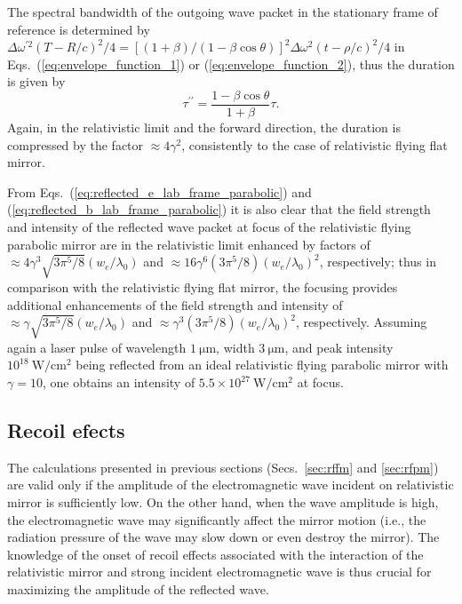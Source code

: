 \documentclass[10pt, a4paper, twoside, openright]{report}
\begin{document}
The spectral bandwidth of the outgoing wave packet in the stationary frame of reference is determined by $ \Delta \omega^{\prime 2} \left( T - R / c \right)^2 / 4 = \left[ \left( 1 + \beta \right) / \left( 1 - \beta \cos \theta \right) \right]^2 \Delta \omega^2 \left( t - \rho / c \right)^2 / 4 $ in Eqs.~(\ref{eq:envelope_function_1}) or (\ref{eq:envelope_function_2}), thus the duration is given by
\begin{equation}\label{key}
	\tau^{\prime \prime} = \frac{1 - \beta \cos \theta}{1 + \beta} \tau.
\end{equation}
Again, in the relativistic limit and the forward direction, the duration is compressed by the factor $ \approx 4 \gamma^2 $, consistently to the case of relativistic flying flat mirror.

From Eqs.~(\ref{eq:reflected_e_lab_frame_parabolic}) and (\ref{eq:reflected_b_lab_frame_parabolic}) it is also clear that the field strength and intensity of the reflected wave packet at focus of the relativistic flying parabolic mirror are in the relativistic limit enhanced by factors of $ \approx 4 \gamma^3 \sqrt{3 \pi^5 / 8} \left( w_e / \lambda_0 \right) $ and $ \approx 16 \gamma^6 \left( 3 \pi^5 / 8 \right) \left( w_e / \lambda_0 \right)^2 $, respectively; thus in comparison with the relativistic flying flat mirror, the focusing provides additional enhancements of the field strength and intensity of $ \approx \gamma \sqrt{3 \pi^5 / 8} \left( w_e / \lambda_0 \right) $ and $ \approx \gamma^3 \left( 3 \pi^5 / 8 \right) \left( w_e / \lambda_0 \right)^2 $, respectively. Assuming again a laser pulse of wavelength $ 1 \ \mathrm{\mu m} $, width $ 3 \ \mathrm{\mu m} $, and peak intensity $ 10^{18} \ \mathrm{W / cm^2} $ being reflected from an ideal relativistic flying parabolic mirror with $ \gamma = 10 $, one obtains an intensity of $ 5.5 \times 10^{27} \ \mathrm{W / cm^2} $ at focus.

\subsection{Recoil efects}

The calculations presented in previous sections (Secs.~\ref{sec:rffm} and \ref{sec:rfpm}) are valid only if the amplitude of the electromagnetic wave incident on relativistic mirror is sufficiently low. On the other hand, when the wave amplitude is high, the electromagnetic wave may significantly affect the mirror motion (i.e., the radiation pressure of the wave may slow down or even destroy the mirror). The knowledge of the onset of recoil effects associated with the interaction of the relativistic mirror and strong incident electromagnetic wave is thus crucial for maximizing the amplitude of the reflected wave.
\end{document}
